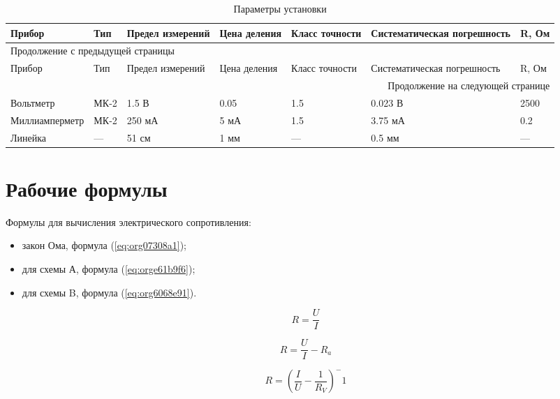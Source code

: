 \documentclass[14pt]{extarticle}
\begin{document}
\begin{longtable}{|p{3.9cm}|l|p{2cm}|p{1.3cm}|p{1.2cm}|p{3.6cm}|p{1.2cm}|}
\caption{\label{tab:org9824420}Параметры установки}
\\[0pt]
\hline
Прибор & Тип & Предел измерений & Цена деления & Класс точности & Систематическая погрешность & R, Ом\\[0pt]
\hline
\endfirsthead
\multicolumn{7}{l}{Продолжение с предыдущей страницы} \\[0pt]
\hline

Прибор & Тип & Предел измерений & Цена деления & Класс точности & Систематическая погрешность & R, Ом \\[0pt]

\hline
\endhead
\hline\multicolumn{7}{r}{Продолжение на следующей странице} \\
\endfoot
\endlastfoot
\hline
Вольтметр & МК-2 & 1.5 В & 0.05 & 1.5 & 0.023 В & 2500\\[0pt]
\hline
Миллиамперметр & МК-2 & 250 мА & 5 мА & 1.5 & 3.75 мА & 0.2\\[0pt]
\hline
Линейка & --- & 51 см & 1 мм & --- & 0.5 мм & ---\\[0pt]
\hline
\end{longtable}

\section{Рабочие формулы}
\label{sec:org0e0d727}

Формулы для вычисления электрического сопротивления:

\begin{itemize}
\item закон Ома, формула (\ref{eq:org07308a1});
\item для схемы А, формула (\ref{eq:orge61b9f6});
\item для схемы B, формула (\ref{eq:org6068e91}).
\end{itemize}

\begin{equation}
\label{eq:org07308a1}
R = \frac{U}{I}
\end{equation}

\begin{equation}
\label{eq:orge61b9f6}
R = \frac{U}{I} - R_a
\end{equation}

\begin{equation}
\label{eq:org6068e91}
R = (\frac{I}{U} - \frac{1}{R_V})^-1
\end{equation}
\end{document}
